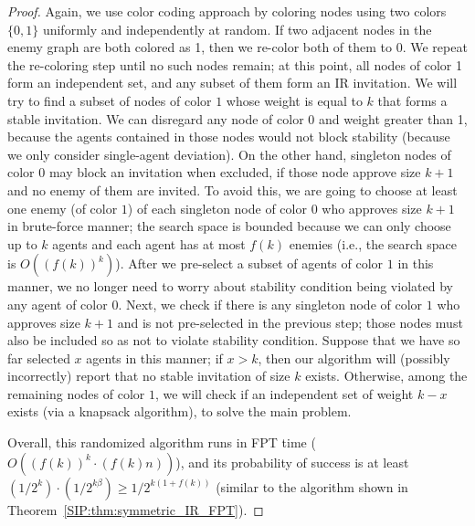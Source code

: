 \begin{proof}
	Again, we use color coding approach by coloring nodes using two colors $\{0,1\}$ uniformly and independently at random. 
	If two adjacent nodes in the enemy graph are both colored as 1, then we re-color both of them to 0. 
	We repeat the re-coloring step until no such nodes remain; at this point, all nodes of color 1 form an independent set, and any subset of them form an IR invitation.
	We will try to find a subset of nodes of color $1$ whose weight is equal to $k$ that forms a stable invitation. We can disregard any node of color 0 and weight greater than 1, because the agents contained in those nodes would not block stability (because we only consider single-agent deviation).
	On the other hand, singleton nodes of color $0$ may block an invitation when excluded, if those node approve size $k+1$ and no enemy of them are invited. 
	To avoid this, we are going to choose at least one enemy (of color $1$) of each singleton node of color $0$ who approves size $k+1$ in brute-force manner; the search space is bounded because we can only choose up to $k$ agents and each agent has at most $f(k)$ enemies (i.e., the search space is $O((f(k))^k)$). After we pre-select a subset of agents of color $1$ in this manner, we no longer need to worry about stability condition being violated by any agent of color $0$. Next, we check if there is any singleton node of color $1$ who approves size $k+1$ and is not pre-selected in the previous step; those nodes must also be included so as not to violate stability condition. Suppose that we have so far selected $x$ agents in this manner; if $x > k$, then our algorithm will (possibly incorrectly) report that no stable invitation of size $k$ exists. Otherwise, among the remaining nodes of color $1$, we will check if an independent set of weight $k - x$ exists (via a knapsack algorithm), to solve the main problem.

		Overall, this randomized algorithm runs in FPT time ($O((f(k))^k \cdot (f(k)n))$), and its probability of success is at least $(1/2^k)\cdot (1/2^{k\beta}) \geq 1/2^{k(1+f(k))}$ (similar to the algorithm shown in Theorem~\ref{SIP:thm:symmetric_IR_FPT}).
		
\end{proof}



